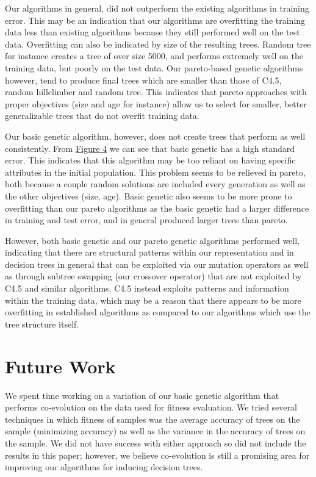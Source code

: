 \documentclass{acm_proc_article-sp}
\begin{document}
Our algorithms in general, did not outperform the existing algorithms in training error. This may be an indication that our algorithms are overfitting the training data less than existing algorithms because they still performed well on the test data. Overfitting can also be indicated by size of the resulting trees. Random tree for instance creates a tree of over size 5000, and performs extremely well on the training data, but poorly on the test data. Our pareto-based genetic algorithms however, tend to produce final trees which are smaller than those of C4.5, random hillclimber and random tree. This indicates that pareto approaches with proper objectives (size and age for instance) allow us to select for smaller, better generalizable trees that do not overfit training data.

Our basic genetic algorithm, however, does not create trees that perform as well consistently. From \hyperref[algorithms]{Figure 4} we can see that basic genetic has a high standard error. This indicates that this algorithm may be too reliant on having specific attributes in the initial population. This problem seems to be relieved in pareto, both because a couple random solutions are included every generation as well as the other objectives (size, age). Basic genetic also seems to be more prone to overfitting than our pareto algorithms as the basic genetic had a larger difference in training and test error, and in general produced larger trees than pareto.

However, both basic genetic and our pareto genetic algorithms performed well, indicating that there are structural patterns within our representation and in decision trees in general that can be exploited via our mutation operators as well as through subtree swapping (our crossover operator) that are not exploited by C4.5 and similar algorithms. C4.5 instead exploits patterns and information within the training data, which may be a reason that there appears to be more overfitting in established algorithms as compared to our algorithms which use the tree structure itself.

\section{Future Work}

We spent time working on a variation of our basic genetic algorithm that performs co-evolution on the data used for fitness evaluation. We tried several techniques in which fitness of samples was the average accuracy of trees on the sample (minimizing accuracy) as well as the variance in the accuracy of trees on the sample. We did not have success with either approach so did not include the results in this paper; however, we believe co-evolution is still a promising area for improving our algorithms for inducing decision trees.
\end{document}
